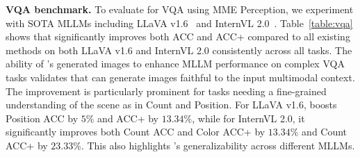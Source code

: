 \textbf{VQA benchmark.} To evaluate \method for VQA using MME Perception, we experiment with SOTA MLLMs including LLaVA v1.6~\citep{liu2024improved} and InternVL 2.0~\citep{chen2024internvl}. Table~\ref{table:vqa} shows that \method significantly improves both ACC and ACC+ compared to all existing methods on both LLaVA v1.6 and InternVL 2.0 consistently across all tasks. The ability of \method's generated images to enhance MLLM performance on complex VQA tasks validates that \method can generate images faithful to the input multimodal context.
The improvement is particularly prominent for tasks needing a fine-grained understanding of the scene as in Count and Position. For LLaVA v1.6, \method boosts Position ACC by $5\%$ and ACC+ by $13.34\%$, 
while for InternVL 2.0, it significantly improves both Count ACC and Color ACC+ by $13.34\%$ and Count ACC+ by $23.33\%$.
This also highlights \method's generalizability across different MLLMs.  






